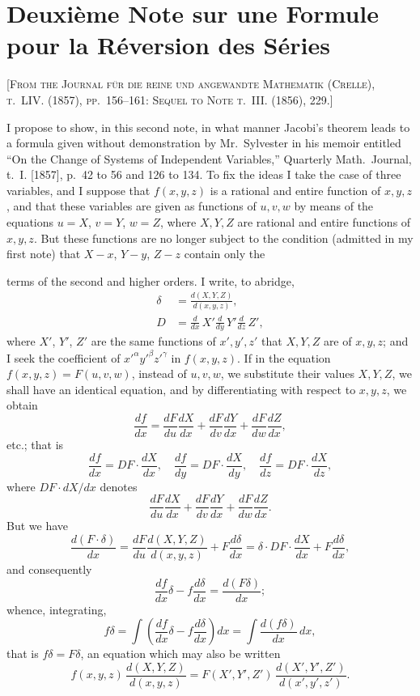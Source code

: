 \documentclass[11pt,a4paper]{article}
\begin{document}
\newpage


\section{Deuxième Note sur une Formule pour la Réversion des Séries}

\textsc{[From the Journal für die reine und angewandte Mathematik (Crelle), t.~LIV. (1857), pp.~156--161: Sequel to Note t.~III. (1856), 229.]}
\label{paper:234}

I propose to show, in this second note, in what manner Jacobi's theorem leads to a formula given without demonstration by Mr.~Sylvester in his memoir entitled ``On the Change of Systems of Independent Variables,'' Quarterly Math.\ Journal, t.~I. [1857], p.~42 to 56 and 126 to 134. To fix the ideas I take the case of three variables, and I suppose that $f(x,y,z)$ is a rational and entire function of $x,y,z$, and that these variables are given as functions of $u,v,w$ by means of the equations $u=X$, $v=Y$, $w=Z$, where $X,Y,Z$ are rational and entire functions of $x,y,z$. But these functions are no longer subject to the condition (admitted in my first note) that $X-x$, $Y-y$, $Z-z$ contain only the

\setcounter{page}{54}

terms of the second and higher orders. I write, to abridge,
\begin{align*}
\delta &= \frac{d(X,Y,Z)}{d(x,y,z)}, \\
D &= \frac{d}{dx}\,X'\frac{d}{dy}\,Y'\frac{d}{dz}\,Z',
\end{align*}
where $X'$, $Y'$, $Z'$ are the same functions of $x',y',z'$ that $X,Y,Z$ are of $x,y,z$; and I seek the coefficient of $x'^\alpha y'^\beta z'^\gamma$ in $f(x,y,z)$. If in the equation $f(x,y,z)=F(u,v,w)$, instead of $u,v,w$, we substitute their values $X,Y,Z$, we shall have an identical equation, and by differentiating with respect to $x,y,z$, we obtain
\[
\frac{df}{dx} = \frac{dF}{du}\frac{dX}{dx} + \frac{dF}{dv}\frac{dY}{dx} + \frac{dF}{dw}\frac{dZ}{dx},
\]
etc.; that is
\[
\frac{df}{dx} = DF \cdot \frac{dX}{dx}, \quad
\frac{df}{dy} = DF \cdot \frac{dX}{dy}, \quad
\frac{df}{dz} = DF \cdot \frac{dX}{dz},
\]
where $DF \cdot dX/dx$ denotes
\[
\frac{dF}{du}\frac{dX}{dx} + \frac{dF}{dv}\frac{dY}{dx} + \frac{dF}{dw}\frac{dZ}{dx}.
\]
But we have
\[
\frac{d(F\cdot\delta)}{dx}
= \frac{dF}{du}\frac{d(X,Y,Z)}{d(x,y,z)} + F\frac{d\delta}{dx}
= \delta \cdot DF\cdot\frac{dX}{dx} + F\frac{d\delta}{dx},
\]
and consequently
\[
\frac{df}{dx}\delta - f\frac{d\delta}{dx} = \frac{d(F\delta)}{dx};
\]
whence, integrating,
\[
f\delta = \int\left(\frac{df}{dx}\delta - f\frac{d\delta}{dx}\right)dx
= \int \frac{d(f\delta)}{dx}\,dx,
\]
that is $f\delta = F\delta$, an equation which may also be written
\[
f(x,y,z)\,\frac{d(X,Y,Z)}{d(x,y,z)} = F(X',Y',Z')\,\frac{d(X',Y',Z')}{d(x',y',z')}.
\]
\end{document}

